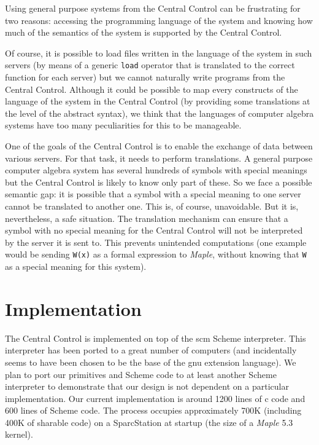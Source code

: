 \documentclass {article}
\begin{document}
Using general purpose systems from the Central Control can be frustrating for
two reasons: accessing the programming language of the system and knowing how
much of the semantics of the system is supported by the Central Control.

Of course, it is possible to load files written in the language of the system
in such servers (by means of a generic {\tt load} operator that is translated
to the correct function for each server) but we cannot naturally write
programs from the Central Control. Although it could be possible to map every
constructs of the language of the system in the Central Control (by providing
some translations at the level of the abstract syntax), we think that the
languages of computer algebra systems have too many peculiarities for this to
be manageable.%

One of the goals of the Central Control is to enable the exchange of data
between various servers. For that task, it needs to perform translations.
A general purpose computer algebra system has several hundreds of symbols
with special meanings but the Central Control is likely to know only part of
these. So we face a possible semantic gap: it is possible that a symbol with
a special meaning to one server cannot be translated to another one. 
This is, of course, unavoidable.
But it is, nevertheless, a safe situation. The translation mechanism can
ensure that a symbol with no special meaning for the Central Control will not
be interpreted by the server it is sent to. 
This prevents unintended
computations (one example would be sending {\tt W(x)} as a formal
expression to {\sl Maple}, without knowing that {\tt W} as a special meaning
for this system).
 



\section{ Implementation }

The Central Control is implemented on top of the {\sc scm} Sche\-me
interpreter. 
This interpreter has been ported to a great number of computers (and 
incidentally seems to have been chosen to be the base of the {\sc gnu}
extension language). 
We plan to port our primitives and Scheme code to at least another Scheme
interpreter to demonstrate that our design is not dependent on a particular
implementation. Our current implementation is around 1200 lines of {\sc c}
code and 600 lines of Scheme code. The process occupies approximately 700K
(including 400K of sharable code) on a SparcStation at startup (the size of a
{\sl Maple} 5.3 kernel).
\end{document}
